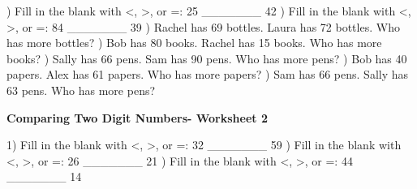 \documentclass{article}%
\begin{document}
\newline%
\newline%
) Fill in the blank with <, >, or =: 25 \_\_\_\_\_\_\_ 42%
\newline%
\newline%
) Fill in the blank with <, >, or =: 84 \_\_\_\_\_\_\_ 39%
\newline%
\newline%
) Rachel has 69 bottles. Laura has 72 bottles. Who has more bottles?%
\newline%
\newline%
) Bob has 80 books. Rachel has 15 books. Who has more books?%
\newline%
\newline%
) Sally has 66 pens. Sam has 90 pens. Who has more pens?%
\newline%
\newline%
) Bob has 40 papers. Alex has 61 papers. Who has more papers?%
\newline%
\newline%
) Sam has 66 pens. Sally has 63 pens. Who has more pens?%
\newline%
\newline%
\newline%
\pagebreak%
\large%
\begin{center}%
\textbf{Comparing Two Digit Numbers- Worksheet 2}%
\newline%
\newline%
\newline%
\end{center} \normalsize%
1) Fill in the blank with <, >, or =: 32 \_\_\_\_\_\_\_ 59%
\newline%
\newline%
) Fill in the blank with <, >, or =: 26 \_\_\_\_\_\_\_ 21%
\newline%
\newline%
) Fill in the blank with <, >, or =: 44 \_\_\_\_\_\_\_ 14%
\newline%
\newline%
\newline%
\end{document}
